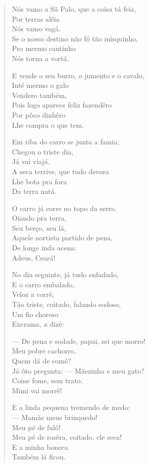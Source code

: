 \begin{verse}
Nós vamo a Sã Palo, que a coisa tá feia,\\
Por terras alêia\\
Nós vamo vagá.\\
Se o nosso destino não fô tão misquinho,\\
Pro mermo cantinho\\
Nós torna a vortá.

E vende o seu burro, o jumento e o cavalo,\\
Inté mermo o galo\\
Vendero também,\\
Pois logo aparece feliz fazendêro\\
Por pôco dinhêro\\
Lhe compra o que tem.

Em riba do carro se junta a famia;\\
Chegou o triste dia,\\
Já vai viajá.\\
A seca terrive, que tudo devora\\
Lhe bota pra fora\\
Da terra natá.

O carro já corre no topo da serra.\\
Oiando pra terra,\\
Seu berço, seu lá,\\
Aquele nortista partido de pena,\\
De longe inda acena:\\
Adeus, Ceará!

No dia seguinte, já tudo enfadado,\\
E o carro embalado,\\
Veloz a corrê,\\
Tão triste, coitado, falando sodoso,\\
Um fio choroso\\
Excrama, a dizê:

--- De pena e sodade, papai, sei que morro!\\
Meu pobre cachorro,\\
Quem dá de comê?\\
Já ôto pregunta: --- Mãezinha e meu gato?\\
Come fome, sem trato,\\
Mimi vai morrê!

E a linda pequena tremendo de medo:\\
--- Mamãe meus brinquedo!\\
Meu pé de fulô!\\
Meu pé de rosêra, coitado, ele seca!\\
E a minha boneca\\
Também lá ficou.


\end{verse}
